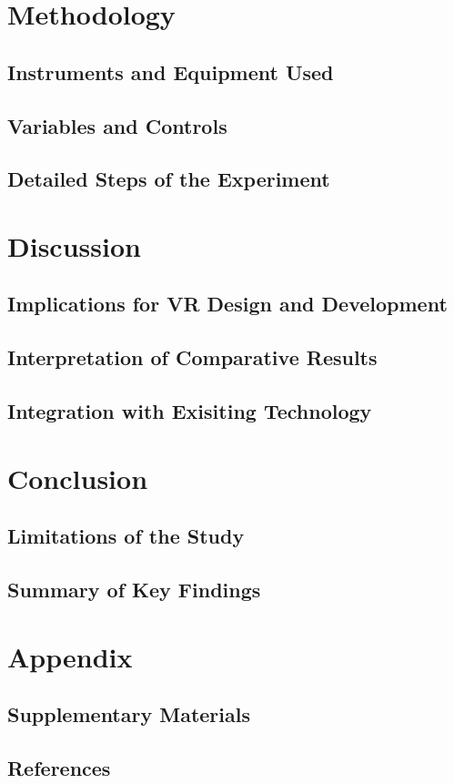 \documentclass[a4paper, 11pt, oneside]{book}
\begin{document}
    \chapter{Methodology}
        \section{Instruments and Equipment Used}
        \section{Variables and Controls}
        \section{Detailed Steps of the Experiment}

    \chapter{Discussion}
        \section{Implications for VR Design and Development}
        \section{Interpretation of Comparative Results}
        \section{Integration with Exisiting Technology}
    
    \chapter{Conclusion}
        \section{Limitations of the Study}
        \section{Summary of Key Findings}

    \chapter{Appendix}
        \section{Supplementary Materials}
        \section{References}
\end{document}
